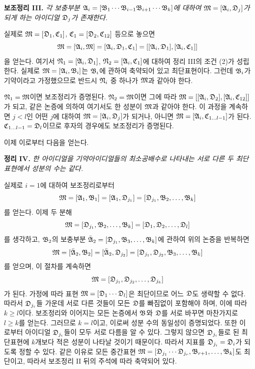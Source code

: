 \textbf{보조정리 III.} \emph{각 보충부분 $\mathfrak{A}_i=[\mathfrak{B}_1\cdots\mathfrak{B}_{i-1}\mathfrak{B}_{i+1}\cdots\mathfrak{B}_k]$에 대하여 $\mathfrak{M}=[\mathfrak{A}_i,\mathfrak{D}_j]$가 되게 하는 아이디얼 $\mathfrak{D}_j$가 존재한다.}

실제로 $\mathfrak{M}=[\mathfrak{D}_1,\mathfrak{C}_1]$, $\mathfrak{C}_1=[\mathfrak{D}_2,\mathfrak{C}_{12}]$ 등으로 놓으면
\[
 \mathfrak{M}=[\mathfrak{A}_i,\mathfrak{M}]=[\mathfrak{A}_i,\mathfrak{D}_1,\mathfrak{C}_1]
 =[[\mathfrak{A}_i,\mathfrak{D}_1],[\mathfrak{A}_i,\mathfrak{C}_1]]
\]
을 얻는다. 여기서 $\mathfrak{N}_1=[\mathfrak{A}_i,\mathfrak{D}_1]$, $\mathfrak{N}_2=[\mathfrak{A}_i,\mathfrak{C}_1]$에 대하여 정리 III의 조건 (2)가 성립한다. 실제로 $\mathfrak{M}=[\mathfrak{A}_i,\mathfrak{B}_i]$는 $\mathfrak{B}_i$에 관하여 축약되어 있고 최단표현이다. 그런데 $\mathfrak{B}_i$가 기약이라고 가정했으므로 반드시 $\mathfrak{N}_i$ 중 하나가 $\mathfrak{M}$과 같아야 한다.

$\mathfrak{N}_1=\mathfrak{M}$이면 보조정리가 증명된다. $\mathfrak{N}_2=\mathfrak{M}$이면 그에 따라 $\mathfrak{M}=[[\mathfrak{A}_i,\mathfrak{D}_2],[\mathfrak{A}_i,\mathfrak{C}_{12}]]$가 되고, 같은 논증에 의하여 여기서도 한 성분이 $\mathfrak{M}$과 같아야 한다. 이 과정을 계속하면 $j<l$인 어떤 $j$에 대하여 $\mathfrak{M}=[\mathfrak{A}_i,\mathfrak{D}_j]$가 되거나, 아니면 $\mathfrak{M}=[\mathfrak{A}_i,\mathfrak{C}_{1\ldots l-1}]$가 된다. $\mathfrak{C}_{1\ldots l-1}=\mathfrak{D}_l$이므로 후자의 경우에도 보조정리가 증명된다.

이제 이로부터 다음을 얻는다.

\textbf{정리 IV.} \emph{한 아이디얼을 기약아이디얼들의 최소공배수로 나타내는 서로 다른 두 최단표현에서 성분의 수는 같다.}

실제로 $i=1$에 대하여 보조정리로부터
\[
 \mathfrak{M}=[\mathfrak{A}_1,\mathfrak{B}_1]=[\mathfrak{A}_1,\mathfrak{D}_{j_1}]
 = [\mathfrak{D}_{j_1},\mathfrak{B}_2,\ldots,\mathfrak{B}_k]
\]
를 얻는다. 이제 두 분해
\[
 \mathfrak{M}=[\mathfrak{D}_{j_1},\mathfrak{B}_2,\ldots,\mathfrak{B}_k]
          =[\mathfrak{D}_1,\mathfrak{D}_2,\ldots,\mathfrak{D}_l]
\]
를 생각하고, $\mathfrak{B}_2$의 보충부분 $\bar{\mathfrak{A}}_2=[\mathfrak{D}_{j_1},\mathfrak{B}_3,\ldots,\mathfrak{B}_k]$에 관하여 위의 논증을 반복하면
\[
 \mathfrak{M}=[\bar{\mathfrak{A}}_2,\mathfrak{B}_2]=[\bar{\mathfrak{A}}_2,\mathfrak{D}_{j_2}]
           =[\mathfrak{D}_{j_1},\mathfrak{D}_{j_2},\mathfrak{B}_3,\ldots,\mathfrak{B}_k]
\]
를 얻으며, 이 절차를 계속하면
\[
 \mathfrak{M}=[\mathfrak{D}_{j_1},\mathfrak{D}_{j_2},\ldots,\mathfrak{D}_{j_k}]
\]
가 된다. 가정에 따라 표현 $\mathfrak{M}=[\mathfrak{D}_1\cdots\mathfrak{D}_l]$은 최단이므로 어느 $\mathfrak{D}$도 생략할 수 없다. 따라서 $\mathfrak{D}_{j_i}$들 가운데 서로 다른 것들이 모든 $\mathfrak{D}$를 빠짐없이 포함해야 하며, 이에 따라 $k\ge l$이다. 보조정리와 이어지는 모든 논증에서 $\mathfrak{B}$와 $\mathfrak{D}$를 서로 바꾸면 마찬가지로 $l\ge k$를 얻는다. 그러므로 $k=l$이고, 이로써 성분 수의 동일성이 증명되었다. 또한 이로부터 아이디얼 $\mathfrak{D}_{j_i}$들이 모두 서로 다름을 알 수 있다. 그렇지 않으면 $\mathfrak{D}_{j_i}$들로 된 최단표현에 $k$개보다 적은 성분이 나타날 것이기 때문이다. 따라서 지표를 $\mathfrak{D}_{j_i}=\mathfrak{D}_i$가 되도록 정할 수 있다. 같은 이유로 모든 중간표현 $\mathfrak{M}=[\mathfrak{D}_{j_1}\cdots\mathfrak{D}_{j_r},\mathfrak{B}_{r+1},\ldots,\mathfrak{B}_k]$도 최단이고, 따라서 보조정리 II 뒤의 주석에 따라 축약되어 있다.

